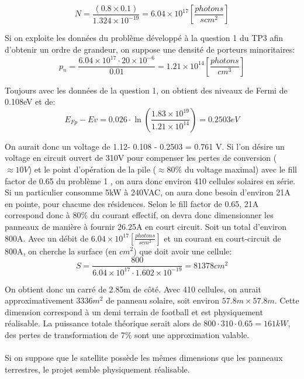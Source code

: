 \begin{equation}
N = \frac{(0.8 \times 0.1)}{1.324\times 10^{-19}} = 6.04\times 10^{17} \left[\frac{photons}{s cm^2}\right]
\end{equation}

Si on exploite les données du problème développé à la question 1 du TP3 afin d'obtenir un ordre de grandeur, on suppose une densité de porteurs minoritaires:
\begin{equation}
p_n = \frac{6.04\times 10^{17} \cdot 20 \times 10^{-6}}{0.01} = 1.21\times 10^{14}\left[\frac{photons}{cm^3}\right]
\end{equation}

Toujours avec les données de la question 1, on obtient des niveaux de Fermi de 0.108eV et de:
\begin{equation}
E_{Fp} - Ev = 0.026\cdot\ln\left(\frac{1.83\times 10^{19}}{1.21\times 10^{14}}\right) = 0.2503eV
\end{equation}

On aurait donc un voltage de 1.12- 0.108 - 0.2503 = 0.761 V. Si l'on désire un voltage en circuit ouvert de 310V pour compenser les pertes de conversion ($\approx 10V$) et le point d'opération de la pile ($\approx 80\%$ du voltage maximal) avec le fill factor de 0.65 du problème 1 , on aura donc environ 410 cellules solaires en série. Si un particulier consomme 5kW à 240VAC, on aura donc besoin d'environ 21A en pointe, pour chacune des résidences. Selon le fill factor de 0.65, 21A correspond donc à 80\% du courant effectif, on devra donc dimensionner les panneaux de manière à fournir 26.25A en court circuit. Soit un total d'environ 800A. Avec un débit de $6.04\times 10^{17} \left[\frac{photons}{s cm^2}\right]$ et un courant en court-circuit de 800A, on cherche la surface (en $cm^2$) que doit avoir une cellule:
\begin{equation}
S = \frac{800}{6.04\times 10^{17} \cdot 1.602 \times 10^{-19}} = 81 378 cm^2
\end{equation}

On obtient donc un carré de 2.85m de côté. Avec 410 cellules, on aurait approximativement 3336$m^2$ de panneau solaire, soit environ $57.8m \times 57.8m$. Cette dimension correspond à un demi terrain de football et est physiquement réalisable. La puissance totale théorique serait alors de $800\cdot 310\cdot0.65 = 161kW$, des pertes de transformation de 7\% sont une approximation valable.

\paragraph{}Si on suppose que le satellite possède les mêmes dimensions que les panneaux terrestres, le projet semble physiquement réalisable. 

